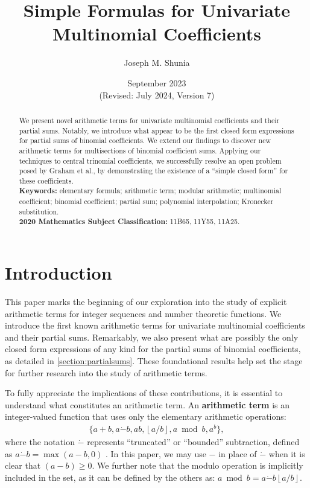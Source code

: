 \documentclass[10pt,a4paper]{article}
\title{Simple Formulas for Univariate Multinomial Coefficients}
\author{Joseph M. Shunia}
\date{September 2023 \\ \small (Revised: July 2024, Version 7) \normalsize}
\theoremstyle{plain}
\newcommand{\floor}[1]{\left\lfloor #1 \right\rfloor}
\begin{document}
\maketitle

 \begin{abstract}
 \noindent
We present novel arithmetic terms for univariate multinomial coefficients and their partial sums. Notably, we introduce what appear to be the first closed form expressions for partial sums of binomial coefficients. We extend our findings to discover new arithmetic terms for multisections of binomial coefficient sums. Applying our techniques to central trinomial coefficients, we successfully resolve an open problem posed by Graham et al., by demonstrating the existence of a ``simple closed form'' for these coefficients.
 \\[2mm]
 {\bf Keywords:} elementary formula; arithmetic term; modular arithmetic; multinomial coefficient; binomial coefficient; partial sum; polynomial interpolation; Kronecker substitution.\\[2mm]
 {\bf 2020 Mathematics Subject Classification:} 11B65, 11Y55, 11A25.
 \end{abstract}

\section{Introduction}
This paper marks the beginning of our exploration into the study of explicit arithmetic terms for integer sequences and number theoretic functions. We introduce the first known arithmetic terms for univariate multinomial coefficients and their partial sums. Remarkably, we also present what are possibly the only closed form expressions of any kind for the partial sums of binomial coefficients, as detailed in \cref{section:partialsums}. These foundational results help set the stage for further research into the study of arithmetic terms.

To fully appreciate the implications of these contributions, it is essential to understand what constitutes an arithmetic term. An \textbf{arithmetic term} is an integer-valued function that uses only the elementary arithmetic operations:
\begin{align*}
    \{ a + b, a \dot{-} b, ab, \floor{a/b}, a \bmod b, a^b \} ,
\end{align*}
where the notation $\dot{-}$ represents ``truncated'' or ``bounded'' subtraction, defined as $a \dot{-} b = \max(a-b,0)$ \cite{mazzanti2002plainbases, prunescu2024representation}. In this paper, we may use $-$ in place of $\dot{-}$ when it is clear that $(a-b) \geq 0$. We further note that the modulo operation is implicitly included in the set, as it can be defined by the others as: $a \bmod b = a \dot{-} b \floor{a/b}$. 
\end{document}
